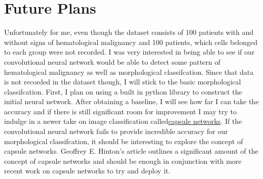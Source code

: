 \documentclass[12pt]{article}
\newcommand\tab[1][1cm]{\hspace*{#1}}
\begin{document}
\section{Future Plans}
\tab Unfortunately for me, even though the dataset consists of 100 patients with and without signs of hematological malignancy and 100 patients, which cells belonged to each group were not recorded. I was very interested in being able to see if our convolutional neural network would be able to detect some pattern of hematological malignancy as well as morphological classifcation. Since that data is not recorded in the dataset though, I will stick to the basic morphological classifcation. First, I plan on using a built in python library to construct the initial neural network. After obtaining a baseline, I will see how far I can take the accuracy and if there is still significant room for improvement I may try to indulge in a newer take on image classification called\href{https://arxiv.org/pdf/1710.09829.pdf}{capsule networks}. If the convolutional neural network fails to provide incredible accuracy for our morphological classifcation, it should be interesting to explore the concept of capsule networks. Geoffrey E. Hinton's article outlines a significant amount of the concept of capsule networks and should be enough in conjunction with more recent work on capsule networks to try and deploy it.



\newpage


\end{document}
